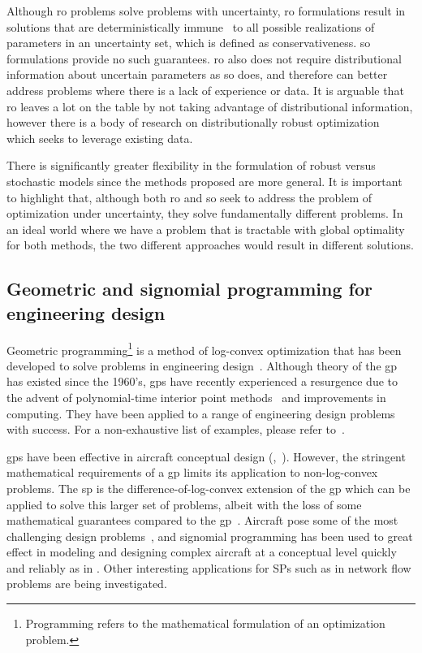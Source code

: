 Although \gls{ro} problems solve problems with uncertainty,
\gls{ro} formulations result in solutions that are deterministically immune~\cite{Bertsimas2011}
to all possible realizations of parameters in an uncertainty set, which is defined as conservativeness.
\gls{so} formulations
provide no such guarantees. \gls{ro} also does not require distributional information
about uncertain parameters as \gls{so} does, and therefore can better address problems where there
is a lack of experience or data. It is arguable that \gls{ro}
leaves a lot on the table by not taking advantage of distributional information,
however there is a body of research on distributionally robust optimization~\cite{Bertsimas2013}
which seeks to leverage existing data.

There is significantly greater flexibility in the formulation of robust versus stochastic models
since the methods proposed are more general. It is important to highlight that,
although both \gls{ro} and \gls{so} seek to address the problem
of optimization under uncertainty, they solve fundamentally different problems. In an ideal world where
we have a problem that is tractable with global optimality for both methods, the two different
approaches would result in different solutions.

\subsection{Geometric and signomial programming for engineering design}

Geometric programming\footnote{Programming refers to the mathematical formulation of an optimization problem.}
is a method of log-convex optimization that has been developed
to solve problems in engineering design~\cite{Duffin1967}. Although theory of the \gls{gp} has existed since
the 1960's, \gls{gp}s have recently experienced a resurgence due to the advent of polynomial-time
interior point methods~\cite{Nesterov1994} and improvements in computing. They have been
applied to a range of engineering design problems with success. For a non-exhaustive list of examples,
please refer to~\cite{Boyd2007}.

\gls{gp}s have been effective in aircraft conceptual design
(\cite{Hoburg2013},~\cite{Burton2017}).
However, the stringent mathematical requirements of a \gls{gp} limits its application to non-log-convex problems.
The \gls{sp} is the difference-of-log-convex extension of the \gls{gp} which can be applied to
solve this larger set of problems, albeit with the loss of some mathematical guarantees compared to the \gls{gp}~\cite{Kirschen2018}.
Aircraft pose some of the most challenging design problems~\cite{York2018}, and signomial programming
has been used to great effect in modeling and designing complex aircraft at a conceptual level quickly
and reliably as in \cite{York2018} \cite{Kirschen2016} \cite{Kirschen2018}.
Other interesting applications for SPs such as in network flow problems are being investigated.

